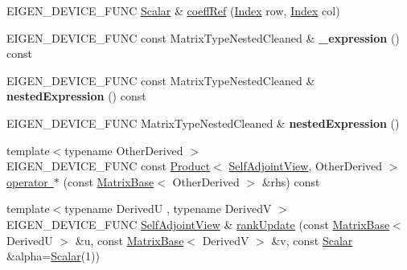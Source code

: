 \begin{DoxyCompactItemize}
\item 
E\+I\+G\+E\+N\+\_\+\+D\+E\+V\+I\+C\+E\+\_\+\+F\+U\+NC \mbox{\hyperlink{class_eigen_1_1_self_adjoint_view_af52acc0942ece2de9b6db4a99cc6656e}{Scalar}} \& \mbox{\hyperlink{class_eigen_1_1_self_adjoint_view_a1f0c389753a56b97bbb26dcab820f111}{coeff\+Ref}} (\mbox{\hyperlink{struct_eigen_1_1_eigen_base_a554f30542cc2316add4b1ea0a492ff02}{Index}} row, \mbox{\hyperlink{struct_eigen_1_1_eigen_base_a554f30542cc2316add4b1ea0a492ff02}{Index}} col)
\item 
\mbox{\label{class_eigen_1_1_self_adjoint_view_add58c169a34d31539439c29b51197bb2}} 
E\+I\+G\+E\+N\+\_\+\+D\+E\+V\+I\+C\+E\+\_\+\+F\+U\+NC const Matrix\+Type\+Nested\+Cleaned \& {\bfseries \+\_\+expression} () const
\item 
\mbox{\label{class_eigen_1_1_self_adjoint_view_a857f2e4eea9daf618d49a41b1d036a25}} 
E\+I\+G\+E\+N\+\_\+\+D\+E\+V\+I\+C\+E\+\_\+\+F\+U\+NC const Matrix\+Type\+Nested\+Cleaned \& {\bfseries nested\+Expression} () const
\item 
\mbox{\label{class_eigen_1_1_self_adjoint_view_a66a1518f827efb1b95e8c2fc7dc9b5c8}} 
E\+I\+G\+E\+N\+\_\+\+D\+E\+V\+I\+C\+E\+\_\+\+F\+U\+NC Matrix\+Type\+Nested\+Cleaned \& {\bfseries nested\+Expression} ()
\item 
{\footnotesize template$<$typename Other\+Derived $>$ }\\E\+I\+G\+E\+N\+\_\+\+D\+E\+V\+I\+C\+E\+\_\+\+F\+U\+NC const \mbox{\hyperlink{class_eigen_1_1_product}{Product}}$<$ \mbox{\hyperlink{class_eigen_1_1_self_adjoint_view}{Self\+Adjoint\+View}}, Other\+Derived $>$ \mbox{\hyperlink{class_eigen_1_1_self_adjoint_view_a7a666957867c422c8b3e0fb4413a2e49}{operator $\ast$}} (const \mbox{\hyperlink{class_eigen_1_1_matrix_base}{Matrix\+Base}}$<$ Other\+Derived $>$ \&rhs) const
\item 
{\footnotesize template$<$typename DerivedU , typename DerivedV $>$ }\\E\+I\+G\+E\+N\+\_\+\+D\+E\+V\+I\+C\+E\+\_\+\+F\+U\+NC \mbox{\hyperlink{class_eigen_1_1_self_adjoint_view}{Self\+Adjoint\+View}} \& \mbox{\hyperlink{class_eigen_1_1_self_adjoint_view_a4739585861baa13b25dcce5ed6658311}{rank\+Update}} (const \mbox{\hyperlink{class_eigen_1_1_matrix_base}{Matrix\+Base}}$<$ DerivedU $>$ \&u, const \mbox{\hyperlink{class_eigen_1_1_matrix_base}{Matrix\+Base}}$<$ DerivedV $>$ \&v, const \mbox{\hyperlink{class_eigen_1_1_self_adjoint_view_af52acc0942ece2de9b6db4a99cc6656e}{Scalar}} \&alpha=\mbox{\hyperlink{class_eigen_1_1_self_adjoint_view_af52acc0942ece2de9b6db4a99cc6656e}{Scalar}}(1))

\end{DoxyCompactItemize}

